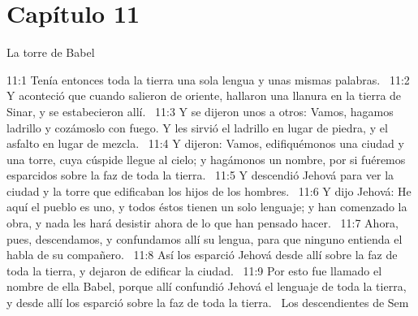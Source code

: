 \section*{Capítulo 11 }
La torre de Babel  

11:1 Tenía entonces toda la tierra una sola lengua y unas mismas palabras.  
11:2 Y aconteció que cuando salieron de oriente, hallaron una llanura en la tierra de Sinar, y se estabecieron allí.  
11:3 Y se dijeron unos a otros: Vamos, hagamos ladrillo y cozámoslo con fuego. Y les sirvió el ladrillo en lugar de piedra, y el asfalto en lugar de mezcla.  
11:4 Y dijeron: Vamos, edifiquémonos una ciudad y una torre, cuya cúspide llegue al cielo; y hagámonos un nombre, por si fuéremos esparcidos sobre la faz de toda la tierra.  
11:5 Y descendió Jehová para ver la ciudad y la torre que edificaban los hijos de los hombres.  
11:6 Y dijo Jehová: He aquí el pueblo es uno, y todos éstos tienen un solo lenguaje; y han comenzado la obra, y nada les hará desistir ahora de lo que han pensado hacer.  
11:7 Ahora, pues, descendamos, y confundamos allí su lengua, para que ninguno entienda el habla de su compañero.  
11:8 Así los esparció Jehová desde allí sobre la faz de toda la tierra, y dejaron de edificar la ciudad.  
11:9 Por esto fue llamado el nombre de ella Babel, porque allí confundió Jehová el lenguaje de toda la tierra, y desde allí los esparció sobre la faz de toda la tierra.  
Los descendientes de Sem  


